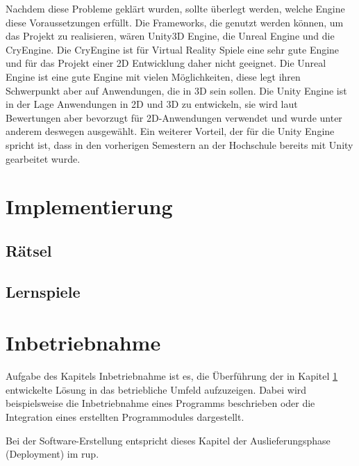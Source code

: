 Nachdem diese Probleme geklärt wurden, sollte überlegt werden, welche Engine diese Voraussetzungen erfüllt. Die Frameworks, die genutzt werden können, um das Projekt zu realisieren, wären Unity3D Engine, die Unreal Engine und die CryEngine. Die CryEngine ist für Virtual Reality Spiele eine sehr gute Engine und für das Projekt einer 2D Entwicklung daher nicht geeignet. Die Unreal Engine ist eine gute Engine mit vielen Möglichkeiten, diese legt ihren Schwerpunkt aber auf Anwendungen, die in 3D sein sollen. Die Unity Engine ist in der Lage Anwendungen in 2D und 3D zu entwickeln, sie wird laut Bewertungen aber bevorzugt für 2D-Anwendungen verwendet und wurde unter anderem deswegen ausgewählt. Ein weiterer Vorteil, der für die Unity Engine spricht ist, dass in den vorherigen Semestern an der Hochschule bereits mit Unity gearbeitet wurde.
\chapter{Implementierung}
\label{cha:implementierung}
\section{Rätsel}
\label{sec:raetsel}

\newpage
\section{Lernspiele}
\label{sec:lernspiele}

\chapter{Inbetriebnahme}
\label{cha:inbetriebnahme}

Aufgabe des Kapitels Inbetriebnahme ist es, die Überführung der in 
Kapitel \ref{cha:implementierung} entwickelte Lösung in das betriebliche 
Umfeld aufzuzeigen. Dabei wird beispielsweise die Inbetriebnahme eines 
Programms beschrieben oder die Integration eines erstellten 
Programmodules dargestellt.

Bei der Software-Erstellung entspricht dieses Kapitel der 
Auslieferungsphase (Deployment) im \ac{rup}.

